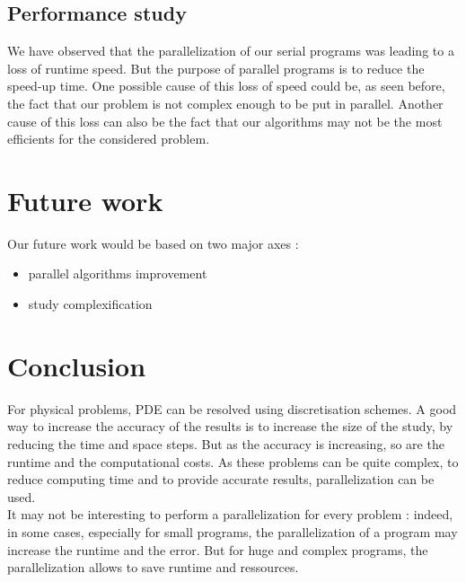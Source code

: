 \documentclass{article}
\begin{document}
            \subsection{Performance study}
                We have observed that the parallelization of our serial programs was leading to a loss of runtime speed. But 
                the purpose of parallel programs is to reduce the speed-up time.\cite{hptc} One possible cause of this loss
                of speed could be, as seen before, the fact that our problem is not complex enough to be put in parallel. Another
                cause of this loss can also be the fact that our algorithms may not be the most efficients for the considered problem.
        \newpage
        \section{Future work}
            Our future work would be based on two major axes : 
            \begin{itemize}
                \item{parallel algorithms improvement}
                \item{study complexification}
            \end{itemize}
        \newpage
        \section{Conclusion}
            For physical problems, PDE can be resolved using discretisation schemes. A good way to increase the accuracy
            of the results is to increase the size of the study, by reducing the time and space steps. But 
            as the accuracy is increasing, so are the runtime and the computational costs. As these problems can be
            quite complex, to reduce computing time and to provide accurate results, parallelization can be used.\\
            It may not be interesting to perform a parallelization for every problem : indeed, in some cases, especially
            for small programs,
            the parallelization of a program may increase the runtime and the error. But for huge and complex
            programs, the parallelization allows to save runtime and ressources.\\
            
    
\end{document}

